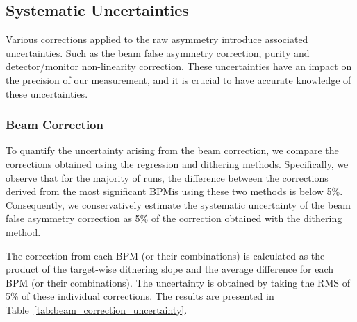\subsection{Systematic Uncertainties}
Various corrections applied to the raw asymmetry introduce associated uncertainties. 
Such as the beam false asymmetry correction, purity and detector/monitor non-linearity correction. 
These uncertainties have an impact on the precision of our measurement, and it is
crucial to have accurate knowledge of these uncertainties.


\subsubsection{Beam Correction}
To quantify the uncertainty arising from the beam correction, we compare 
the corrections obtained using the regression and dithering methods. Specifically, we observe that for the majority of runs, the difference between the corrections derived from the most significant BPMis using these two methods is below 5\%. Consequently, we conservatively estimate the systematic uncertainty of the beam false asymmetry correction as 5\% of the correction obtained with the dithering method.

The correction from each BPM (or their combinations) is calculated as the product of the target-wise dithering slope and the average difference for each BPM (or their combinations). The uncertainty is obtained by taking the RMS of 5\% of these individual corrections. The results are presented in Table~\ref{tab:beam_correction_uncertainty}.

